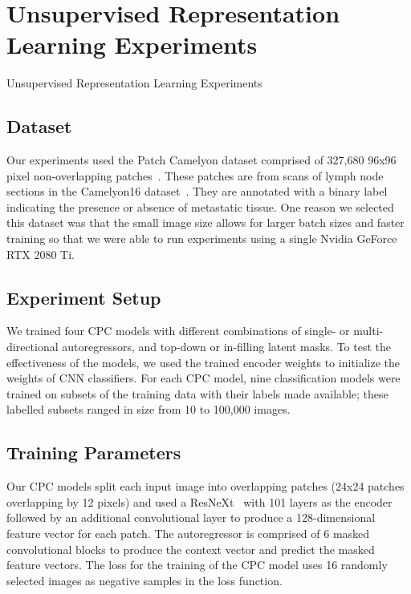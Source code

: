 \section{Unsupervised Representation Learning Experiments}
\label{sec:unsupervised_experiments}
Unsupervised Representation Learning Experiments

\subsection{Dataset}
\label{subsec:unsupervised_dataset}
Our experiments used the Patch Camelyon dataset comprised of 327,680 96x96 pixel non-overlapping patches~\cite{veeling2018rotation}. These patches are from scans of lymph node sections in the Camelyon16 dataset~\cite{litjens20181399}. They are annotated with a binary label indicating the presence or absence of metastatic tissue. One reason we selected this dataset was that the small image size allows for larger batch sizes and faster training so that we were able to run experiments using a single Nvidia GeForce RTX 2080 Ti.

\subsection{Experiment Setup}
\label{subsec:unsupervised_experiment}
We trained four CPC models with different combinations of single- or multi-directional autoregressors, and top-down or in-filling latent masks. To test the effectiveness of the models, we used the trained encoder weights to initialize the weights of CNN classifiers. For each CPC model, nine classification models were trained on subsets of the training data with their labels made available; these labelled subsets ranged in size from 10 to 100,000 images.

\subsection{Training Parameters}
\label{subsec:unsupervised_training}
Our CPC models split each input image into overlapping patches (24x24 patches overlapping by 12 pixels) and used a ResNeXt~\cite{xie2017aggregated} with 101 layers as the encoder followed by an additional convolutional layer to produce a 128-dimensional feature vector for each patch. The autoregressor is comprised of 6 masked convolutional blocks to produce the context vector and predict the masked feature vectors. The loss for the training of the CPC model uses 16 randomly selected images as negative samples in the loss function.

